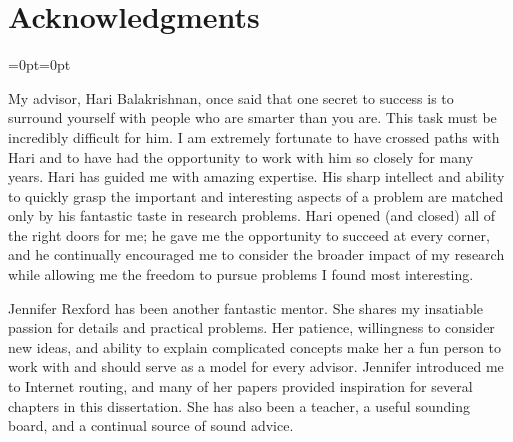 






\chapter*{Acknowledgments}

{\hbox{}=0pt=0pt}



\noindent
My advisor, Hari Balakrishnan, once said that one secret to success is
to surround yourself with people who are smarter than you are.  This
task must be incredibly difficult for him.  I am extremely fortunate to
have crossed paths with Hari and to have had the opportunity to work
with him so closely for many years.  Hari has guided me with amazing
expertise.  His sharp intellect and ability to quickly grasp the
important and interesting aspects of a problem are matched only by his
fantastic taste in research problems.  Hari opened (and closed) all of
the right doors for me; he gave me the opportunity to succeed at every
corner, and he continually encouraged me to consider the broader impact of my
research while allowing me the freedom to pursue problems I found most
interesting.

Jennifer Rexford has been another fantastic mentor.  She shares my
insatiable passion for details and practical problems.  Her patience,
willingness to consider new ideas, and ability to explain complicated
concepts make her a fun person to work with and should serve as a model
for every advisor.  Jennifer introduced me to Internet routing, and many
of her papers provided inspiration for several chapters in this
dissertation.  She has also been a teacher, a useful sounding board, and
a continual source of sound advice.

